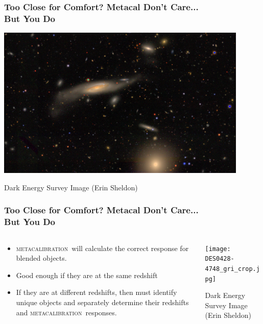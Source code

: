 \documentclass{beamer}
\newcommand{\mcal}{\textsc{metacalibration}}
\begin{document}
\frame
{
    \frametitle{Too Close for Comfort?  Metacal Don't Care... \\But You Do}
 
    \begin{center}
        \includegraphics[width=0.9\textwidth]{DES0056-5248_gri_crop.jpg}
    \end{center}
    {\footnotesize Dark Energy Survey Image (Erin Sheldon)}

}

\frame
{
    \frametitle{Too Close for Comfort?  Metacal Don't Care... \\But You Do}
 
 
    \begin{columns}
        \begin{column}{0.5\textwidth}
            \begin{itemize}
                \item \mcal\ will calculate the correct response
                    for blended objects.
                \item Good enough if they are at the same redshift
                \item If they are at different redshifts, then must
                    identify unique objects and separately
                    determine their redshifts and \mcal\ responses.
            \end{itemize}
        \end{column}
        \begin{column}{0.5\textwidth}
            \begin{center}
                \texttt{[image: DES0428-4748\_gri\_crop.jpg]}
            \end{center}
                {\footnotesize Dark Energy Survey Image (Erin Sheldon)}
        \end{column}
    \end{columns}


}
\end{document}
